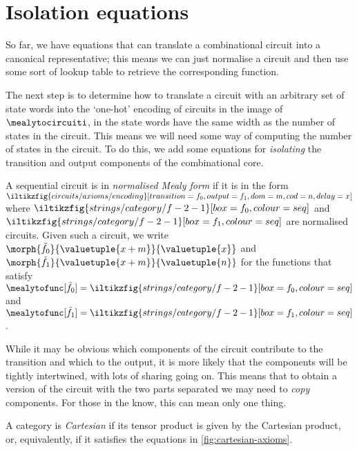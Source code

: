 \section{Isolation equations}

So far, we have equations that can translate a combinational circuit into a
canonical representative; this means we can just normalise a circuit and then
use some sort of lookup table to retrieve the corresponding function.

The next step is to determine how to translate a circuit with an arbitrary
set of state words into the `one-hot' encoding of circuits in the image of
\(\mealytocircuiti\), in the state words have the same width as the number of
states in the circuit.
This means we will need some way of computing the number of states in the
circuit.
To do this, we add some equations for \emph{isolating} the transition and output
components of the combinational core.

\begin{definition}
    A sequential circuit is in \emph{normalised Mealy form} if it is in the form
    \(
        \iltikzfig{circuits/axioms/encoding}[transition={f_0},output={f_1},dom=m,cod=n,delay=x]
    \) where \(
        \iltikzfig{strings/category/f-2-1}[box=f_0,colour=seq]
    \) and \(
        \iltikzfig{strings/category/f-2-1}[box=f_1,colour=seq]
    \) are normalised circuits.
    Given such a circuit, we write \(
        \morph{\tilde{f}_{0}}{\valuetuple{x+m}}{{\valuetuple{x}}}
    \) and \(
        \morph{\tilde{f}_{1}}{\valuetuple{x+m}}{{\valuetuple{n}}}
    \) for the functions that satisfy \(
        \mealytofunc[\tilde{f}_{0}] = \iltikzfig{strings/category/f-2-1}[box=f_0,colour=seq]
    \) and \(
        \mealytofunc[\tilde{f}_{1}] = \iltikzfig{strings/category/f-2-1}[box=f_1,colour=seq]
    \).
\end{definition}

While it may be obvious which components of the circuit contribute to the
transition and which to the output, it is more likely that the components will
be tightly intertwined, with lots of sharing going on.
This means that to obtain a version of the circuit with the two parts separated
we may need to \emph{copy} components.
For those in the know, this can mean only one thing.

\begin{definition}
    A category is \emph{Cartesian} if its tensor product is given by the Cartesian
    product, or, equivalently, if it satisfies the equations in
    \cref{fig:cartesian-axioms}.
\end{definition}

